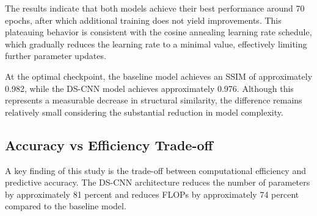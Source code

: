 \documentclass[conference]{IEEEtran}
\begin{document}
The results indicate that both models achieve their best performance around 70 epochs, after which additional training does not yield improvements. This plateauing behavior is consistent with the cosine annealing learning rate schedule, which gradually reduces the learning rate to a minimal value, effectively limiting further parameter updates.

At the optimal checkpoint, the baseline model achieves an SSIM of approximately 0.982, while the DS-CNN model achieves approximately 0.976. Although this represents a measurable decrease in structural similarity, the difference remains relatively small considering the substantial reduction in model complexity.

\subsection{\textbf{Accuracy vs Efficiency Trade-off}}

A key finding of this study is the trade-off between computational efficiency and predictive accuracy. The DS-CNN architecture reduces the number of parameters by approximately 81 percent and reduces FLOPs by approximately 74 percent compared to the baseline model.



\vspace{0.5em}
\begin{table}[h]
\centering
\caption{Accuracy versus computational cost trade-off for Baseline U-Net and DS-CNN variants. The table compares structural similarity (SSIM) against computational complexity measured in FLOPs and parameter count.}
\label{tab:tradeoff_curve}

\end{table}
\end{document}
